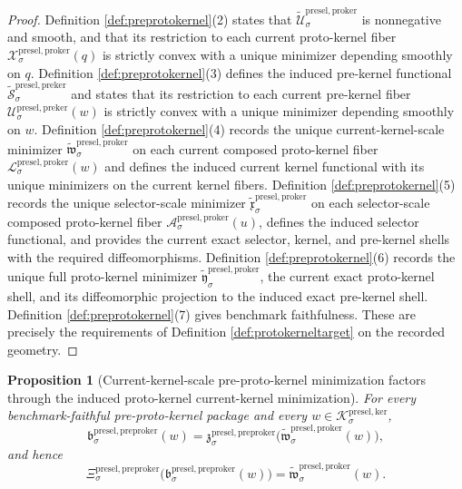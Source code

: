 \documentclass[11pt]{article}
\newcommand{\KernelBody}[1]{\mathcal K_{#1}^{\mathrm{presel,ker}}}
\newcommand{\PreKernelFiber}[2]{\mathcal U_{#1}^{\mathrm{presel,preker}}(#2)}
\newcommand{\ProtoKernelFiber}[2]{\mathcal X_{#1}^{\mathrm{presel,proker}}(#2)}
\newcommand{\ProtoKernelKernelFiber}[2]{\mathcal L_{#1}^{\mathrm{presel,proker}}(#2)}
\newcommand{\ProtoKernelSelectorFiber}[2]{\mathcal A_{#1}^{\mathrm{presel,proker}}(#2)}
\newcommand{\PreProtoKernelProj}[1]{\Xi_{#1}^{\mathrm{presel,preproker}}}
\newcommand{\PreProtoKernelMinLift}[1]{\mathfrak z_{#1}^{\mathrm{presel,preproker}}}
\newcommand{\PreProtoKernelKernelMin}[1]{\mathfrak b_{#1}^{\mathrm{presel,preproker}}}
\newcommand{\InducedPreKernelFunctional}[1]{\widetilde{\mathscr S}_{#1}^{\mathrm{presel,preker}}}
\newcommand{\InducedProtoKernelFunctional}[1]{\widetilde{\mathscr U}_{#1}^{\mathrm{presel,proker}}}
\newcommand{\InducedProtoKernelKernelMin}[1]{\widetilde{\mathfrak w}_{#1}^{\mathrm{presel,proker}}}
\newcommand{\InducedProtoKernelSelectorMin}[1]{\widetilde{\mathfrak x}_{#1}^{\mathrm{presel,proker}}}
\newcommand{\InducedProtoKernelFullMin}[1]{\widetilde{\mathfrak y}_{#1}^{\mathrm{presel,proker}}}
\newtheorem{proposition}{Proposition}
\begin{document}
\begin{proof}
Definition \ref{def:preprotokernel}(2) states that \(\InducedProtoKernelFunctional{\sigma}\) is nonnegative and smooth, and that its restriction to each current proto-kernel fiber \(\ProtoKernelFiber{\sigma}{q}\) is strictly convex with a unique minimizer depending smoothly on \(q\). Definition \ref{def:preprotokernel}(3) defines the induced pre-kernel functional \(\InducedPreKernelFunctional{\sigma}\) and states that its restriction to each current pre-kernel fiber \(\PreKernelFiber{\sigma}{w}\) is strictly convex with a unique minimizer depending smoothly on \(w\). Definition \ref{def:preprotokernel}(4) records the unique current-kernel-scale minimizer \(\InducedProtoKernelKernelMin{\sigma}\) on each current composed proto-kernel fiber \(\ProtoKernelKernelFiber{\sigma}{w}\) and defines the induced current kernel functional with its unique minimizers on the current kernel fibers. Definition \ref{def:preprotokernel}(5) records the unique selector-scale minimizer \(\InducedProtoKernelSelectorMin{\sigma}\) on each selector-scale composed proto-kernel fiber \(\ProtoKernelSelectorFiber{\sigma}{u}\), defines the induced selector functional, and provides the current exact selector, kernel, and pre-kernel shells with the required diffeomorphisms. Definition \ref{def:preprotokernel}(6) records the unique full proto-kernel minimizer \(\InducedProtoKernelFullMin{\sigma}\), the current exact proto-kernel shell, and its diffeomorphic projection to the induced exact pre-kernel shell. Definition \ref{def:preprotokernel}(7) gives benchmark faithfulness. These are precisely the requirements of Definition \ref{def:protokerneltarget} on the recorded geometry.
\end{proof}

\begin{proposition}[Current-kernel-scale pre-proto-kernel minimization factors through the induced proto-kernel current-kernel minimization]
\label{prop:kernelfactor}
For every benchmark-faithful pre-proto-kernel package and every \(w\in\KernelBody{\sigma}\),
\[
\PreProtoKernelKernelMin{\sigma}(w)
=
\PreProtoKernelMinLift{\sigma}\bigl(\InducedProtoKernelKernelMin{\sigma}(w)\bigr),
\]
and hence
\[
\PreProtoKernelProj{\sigma}\bigl(\PreProtoKernelKernelMin{\sigma}(w)\bigr)
=
\InducedProtoKernelKernelMin{\sigma}(w).
\]
\end{proposition}
\end{document}
